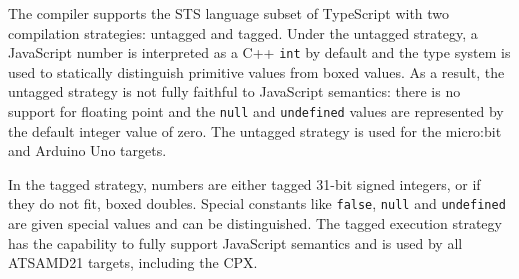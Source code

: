 \label{sec:untagged-tagged}
The \MC compiler supports the STS language subset of TypeScript
with two compilation strategies: untagged and tagged. Under the untagged strategy,
a JavaScript number is interpreted as a C++ \texttt{int} by default and the type system is used
to statically distinguish primitive values from boxed values. As a result, the untagged
strategy is not fully faithful to JavaScript semantics: there is no support for floating
point and the \texttt{null} and \texttt{undefined} values are represented by the default integer value of zero. The untagged strategy is used for the micro:bit and Arduino Uno targets.

In the tagged strategy, numbers are either tagged 31-bit signed integers, or if they do not fit, boxed doubles. Special constants like \texttt{false}, \texttt{null} and \texttt{undefined} are given special values and can be distinguished. The tagged execution strategy has the capability to fully support JavaScript semantics and 
is used by all ATSAMD21 targets, including the CPX.
